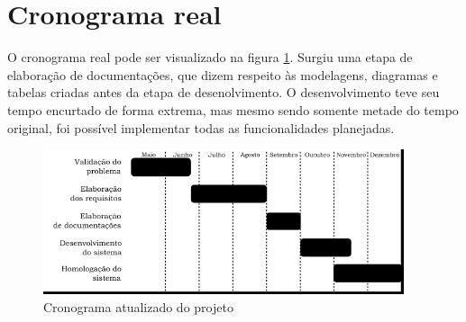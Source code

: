 \section{Cronograma real}

O cronograma real pode ser visualizado na figura \ref{fig:cronograma-atualizado}. Surgiu uma etapa de elaboração de documentações, que dizem respeito às modelagens, diagramas e tabelas criadas antes da etapa de desenolvimento. O desenvolvimento teve seu tempo encurtado de forma extrema, mas mesmo sendo somente metade do tempo original,
foi possível implementar todas as funcionalidades planejadas.


\begin{figure}[ht]
    \begin{center}
    \includegraphics[width=300pt]{figuras/cronograma-atualizado}
    \caption{Cronograma atualizado do projeto}
    \label{fig:cronograma-atualizado}
    \end{center}
\end{figure}

